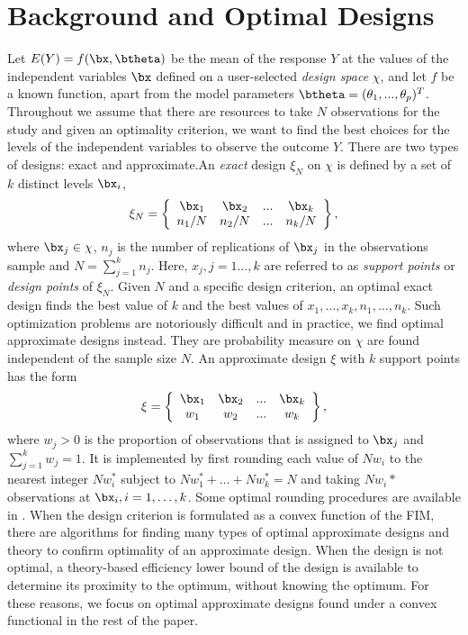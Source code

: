 \section{Background and Optimal Designs}
\label{sec:background}
Let $E(Y)=f(\bx,\btheta)$ be the mean of the response $Y$ at the values of the independent variables $\bx$  defined on   a user-selected   {\it design space} $\chi$, and let  $f$ be a known function, apart from the model parameters $\btheta = (\theta_1,..., \theta_p)^T$.  Throughout we assume that there are resources to take $N$ observations for the study and given an optimality criterion, we want to find the best choices for the levels of the independent variables to observe the outcome $Y$.  There are two types of designs: exact and approximate.An {\it exact}  design $\xi_N$ on $\chi$  is  defined by a set of $k$ distinct  levels $\bx_i$,
\begin{equation}
\label{eq-exact-design}
\xi_N =
  \left\{
    \begin{array}{cccc}
    \bx_1 & \bx_2 & ... & \bx_k\\
    n_1/N & n_2/N & ...& n_k/N
    \end{array}
    \right\},
\end{equation}
where $\bx_j \in \chi$, $n_j$ is  the  number of replications of $\bx_j$ in the observations sample and  $N = \sum_{j=1}^kn_j$.
Here, $x_j, j = 1..., k$  are  referred to as {\it support points} or {\it design points} of $\xi_N$.
Given $N$ and a specific design criterion, an optimal exact design finds the best value of $k$ and the best values of $x_1,\ldots,x_k,n_1,\ldots,n_k$.  Such optimization problems are notoriously difficult and in practice, we find optimal approximate designs instead.  They are probability measure on  $\chi$  are found   independent of the sample size $N$.
An approximate design $\xi$ with $k$ support points has the form
\begin{equation}
\label{eq-approximate-design}
\xi =
  \left\{
    \begin{array}{cccc}
    \bx_1 & \bx_2 & ... & \bx_k\\
    w_1 & w_2 & ...& w_k
    \end{array}
    \right\},
\end{equation}
where $w_j> 0$ is the proportion of observations that is assigned to  $\bx_j$ and $\sum_{j=1}^{k} w_j = 1$.
It is implemented by  first rounding each value of $Nw_i$ to the nearest integer $Nw_i^*$    subject to $Nw_1^*+\ldots+Nw_k^*=N$ and taking $Nw_i*$ observations at $\bx_i,i=1,\ldots,k$.  Some optimal rounding procedures are available in \citep{pukelsheim1992}.
When the design criterion is formulated as a convex function of the FIM, there are algorithms for finding many types of optimal approximate designs and theory to   confirm optimality of an approximate design.  When the design is not optimal, a theory-based efficiency lower bound of the design is available to determine its proximity to the optimum, without knowing the optimum.  For these reasons, we focus on  optimal approximate designs found under a convex functional in the rest of the paper.

